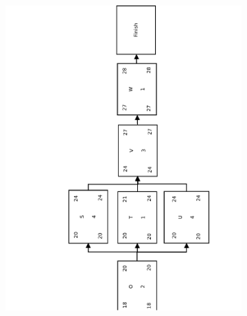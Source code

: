 \begin{figure}
  \caption{Final Project PDM}
    \begin{subfigure}{\textwidth}
        \includegraphics[scale=0.6]{figures/hw5-pdm-3}
    \end{subfigure}
    \label{figure:pdm}
\end{figure}
